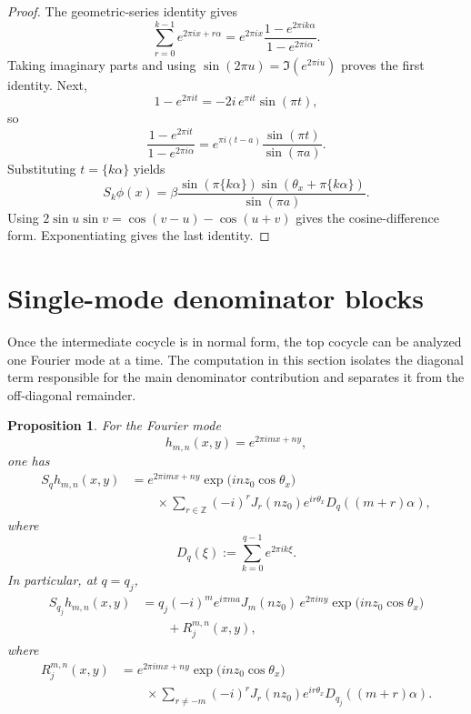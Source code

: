 \documentclass[11pt,reqno]{amsart}
\newtheorem{proposition}[theorem]{Proposition}
\theoremstyle{definition}
\newcommand{\Z}{\mathbb{Z}}
\newcommand{\e}[1]{e^{2\pi i #1}}
\newcommand{\qj}{q_j}
\begin{document}
\begin{proof}
The geometric-series identity gives
\[
\sum_{r=0}^{k-1}\e{x+r\alpha}
=
\e{x}\frac{1-\e{k\alpha}}{1-\e{\alpha}}.
\]
Taking imaginary parts and using $\sin(2\pi u)=\Im(\e{u})$ proves the first identity. Next,
\[
1-\e{t}=-2i\,e^{\pi i t}\sin(\pi t),
\]
so
\[
\frac{1-\e{t}}{1-\e{\alpha}}
=
e^{\pi i(t-a)}\frac{\sin(\pi t)}{\sin(\pi a)}.
\]
Substituting $t=\{k\alpha\}$ yields
\[
S_k\phi(x)
=
\beta \frac{\sin(\pi\{k\alpha\})\sin(\theta_x+\pi\{k\alpha\})}{\sin(\pi a)}.
\]
Using $2\sin u\sin v=\cos(v-u)-\cos(u+v)$ gives the cosine-difference form. Exponentiating gives
the last identity.
\end{proof}

\section{Single-mode denominator blocks}\label{sec:single-mode}

Once the intermediate cocycle is in normal form, the top cocycle can be analyzed one Fourier mode
at a time. The computation in this section isolates the diagonal term responsible for the main
denominator contribution and separates it from the off-diagonal remainder.

\begin{proposition}\label{prop:single-mode}
For the Fourier mode
\[
h_{m,n}(x,y)=\e{mx+ny},
\]
one has
\[
\begin{aligned}
S_q h_{m,n}(x,y)
&=
\e{mx+ny}\exp\!\bigl(i n z_0\cos\theta_x\bigr)\\
&\qquad \times \sum_{r\in\Z} (-i)^r J_r(nz_0)e^{i r\theta_x} D_q((m+r)\alpha),
\end{aligned}
\]
where
\[
D_q(\xi):=\sum_{k=0}^{q-1}\e{k\xi}.
\]
In particular, at $q=\qj$,
\[
\begin{aligned}
S_{\qj} h_{m,n}(x,y)
&=
\qj (-i)^m e^{i\pi m a} J_m(nz_0)\,\e{ny}\exp\!\bigl(i n z_0\cos\theta_x\bigr)\\
&\qquad +R_j^{m,n}(x,y),
\end{aligned}
\]
where
\[
\begin{aligned}
R_j^{m,n}(x,y)
&=
\e{mx+ny}\exp\!\bigl(i n z_0\cos\theta_x\bigr)\\
&\qquad \times \sum_{r\ne -m} (-i)^r J_r(nz_0)e^{i r\theta_x} D_{\qj}((m+r)\alpha).
\end{aligned}
\]
\end{proposition}
\end{document}
